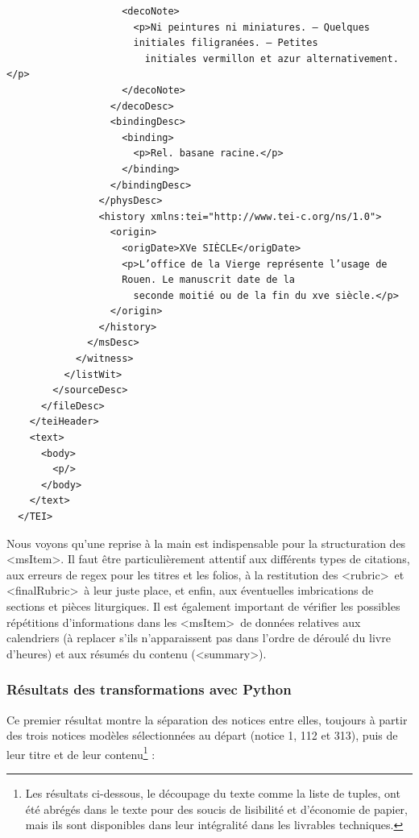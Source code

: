 \documentclass[a4paper,12pt,twoside]{book}
\begin{document}
\begin{verbatim}
                    <decoNote>
                      <p>Ni peintures ni miniatures. — Quelques 
                      initiales filigranées. — Petites
                        initiales vermillon et azur alternativement.</p>
                    </decoNote>
                  </decoDesc>
                  <bindingDesc>
                    <binding>
                      <p>Rel. basane racine.</p>
                    </binding>
                  </bindingDesc>
                </physDesc>
                <history xmlns:tei="http://www.tei-c.org/ns/1.0">
                  <origin>
                    <origDate>XVe SIÈCLE</origDate>
                    <p>L’office de la Vierge représente l’usage de
                    Rouen. Le manuscrit date de la
                      seconde moitié ou de la fin du xve siècle.</p>
                  </origin>
                </history>
              </msDesc>
            </witness>
          </listWit>
        </sourceDesc>
      </fileDesc>
    </teiHeader>
    <text>
      <body>
        <p/>
      </body>
    </text>
  </TEI>
	\end{verbatim}
	
	Nous voyons qu'une reprise à la main est indispensable pour la structuration des \textless msItem\textgreater . Il faut être particulièrement attentif aux différents types de citations, aux erreurs de regex pour les titres et les folios, à la restitution des \textless rubric\textgreater~et \textless finalRubric\textgreater~à leur juste place, et enfin, aux éventuelles imbrications de sections et pièces liturgiques. Il est également important de vérifier les possibles répétitions d'informations dans les \textless msItem\textgreater~de données relatives aux calendriers (à replacer s'ils n'apparaissent pas dans l'ordre de déroulé du livre d'heures) et aux résumés du contenu (\textless summary\textgreater).
	
	\subsubsection{\label{resultats_python}Résultats des transformations avec Python}
	
	Ce premier résultat montre la séparation des notices entre elles, toujours à partir des trois notices modèles sélectionnées au départ (notice 1, 112 et 313), puis de leur titre et de leur contenu\footnote{Les résultats ci-dessous, le découpage du texte comme la liste de tuples, ont été abrégés dans le texte pour des soucis de lisibilité et d'économie de papier, mais ils sont disponibles dans leur intégralité dans les livrables techniques.} : 
\end{document}
